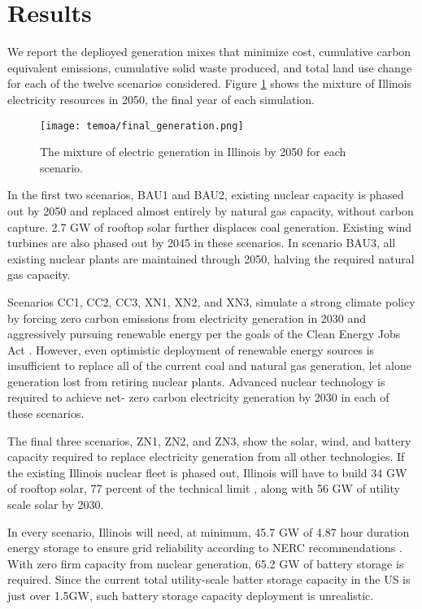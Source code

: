 \section{Results}\label{sec:results}

We report the deplioyed generation mixes that minimize cost, cumulative carbon 
equivalent emissions,
cumulative solid waste produced, and total land use change for each of the
twelve scenarios considered. Figure \ref{fig:cap-2050} shows the mixture of
Illinois electricity resources in 2050, the final year of each simulation.

\begin{figure}[H]
  \centering
  \texttt{[image: temoa/final\_generation.png]}
  \caption{The mixture of electric generation in Illinois by 2050 for each scenario.}
  \label{fig:cap-2050}
\end{figure}

In the first two scenarios, BAU1 and BAU2, existing nuclear capacity is phased out
by 2050 and replaced almost entirely by natural gas capacity, without carbon
capture. 2.7 GW of rooftop solar further displaces coal generation.
Existing wind turbines are also phased out by 2045 in these scenarios. In
scenario BAU3, all existing nuclear plants are maintained through 2050, halving
the required natural gas capacity.

Scenarios CC1, CC2, CC3, XN1, XN2, and XN3, simulate a strong climate policy by
forcing zero carbon emissions from electricity generation in 2030 and
aggressively pursuing renewable energy per the goals of the Clean Energy Jobs
Act \cite{illinois_clean_jobs_coalition_clean_2021}. However, even optimistic
deployment of renewable energy sources is insufficient to replace all of the
current coal and natural gas generation, let alone generation lost from
retiring nuclear plants. Advanced nuclear technology is required to achieve net-
zero carbon electricity generation by 2030 in each of these scenarios.

The final three scenarios, ZN1, ZN2, and ZN3, show the solar, wind, and battery
capacity required to replace electricity generation from all other technologies.
If the existing Illinois nuclear fleet is phased out, Illinois will have to
build 34 GW of rooftop solar, 77 percent of the technical limit \cite{gagnon_rooftop_2016}, along with 56 GW of utility scale solar by 2030.

In every scenario, Illinois will need, at minimum, 45.7 GW of 4.87 hour duration
energy storage to ensure grid reliability according to NERC recommendations
\cite{milligan_methods_2011}. With zero firm capacity from nuclear
generation, 65.2 GW of battery storage is required. Since the current total 
utility-scale batter storage capacity in the US is just over 1.5GW, such 
battery storage capacity deployment is unrealistic.

